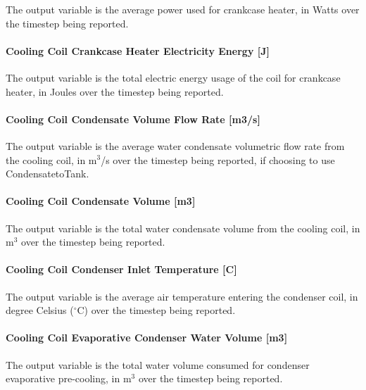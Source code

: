 The output variable is the average power used for crankcase heater, in Watts over the timestep being reported.

\paragraph{Cooling Coil Crankcase Heater Electricity Energy {[}J{]}}\label{cooling-coil-crankcase-heater-electric-energy-j-1}

The output variable is the total electric energy usage of the coil for crankcase heater, in Joules over the timestep being reported.

\paragraph{Cooling Coil Condensate Volume Flow Rate {[}m3/s{]}}\label{cooling-coil-condensate-volume-flow-rate-m3s-5}

The output variable is the average water condensate volumetric flow rate from the cooling coil, in m\(^{3}\)/s over the timestep being reported, if choosing to use CondensatetoTank.

\paragraph{Cooling Coil Condensate Volume {[}m3{]}}\label{cooling-coil-condensate-volume-m3-5}

The output variable is the total water condensate volume from the cooling coil, in m\(^{3}\) over the timestep being reported.

\paragraph{Cooling Coil Condenser Inlet Temperature {[}C{]}}\label{cooling-coil-condenser-inlet-temperature-c-1}

The output variable is the average air temperature entering the condenser coil, in degree Celsius ($^\circ$C) over the timestep being reported.

\paragraph{Cooling Coil Evaporative Condenser Water Volume {[}m3{]}}\label{cooling-coil-evaporative-condenser-water-volume-m3-1}

The output variable is the total water volume consumed for condenser evaporative pre-cooling, in m\(^{3}\) over the timestep being reported.

